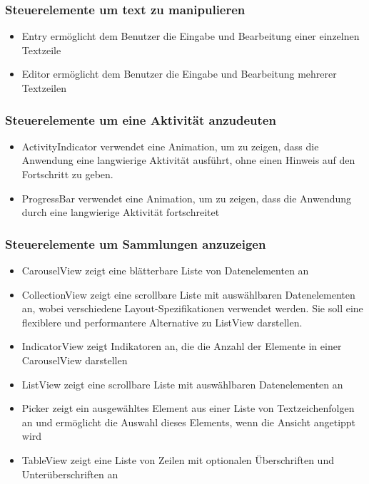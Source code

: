 \subsubsection{Steuerelemente um text zu manipulieren}

\begin{itemize}
\setlength\itemsep{-0.6em}
 \item Entry ermöglicht dem Benutzer die Eingabe und Bearbeitung einer einzelnen Textzeile
 \item Editor ermöglicht dem Benutzer die Eingabe und Bearbeitung mehrerer Textzeilen
\end{itemize}
\subsubsection{Steuerelemente um eine Aktivität anzudeuten}


\begin{itemize}
\setlength\itemsep{-0.6em}
 \item ActivityIndicator verwendet eine Animation, um zu zeigen, dass die Anwendung eine langwierige Aktivität ausführt, ohne einen Hinweis auf den Fortschritt zu geben. 
 \item ProgressBar verwendet eine Animation, um zu zeigen, dass die Anwendung durch eine langwierige Aktivität fortschreitet
\end{itemize}

\subsubsection{Steuerelemente um Sammlungen anzuzeigen}
\begin{itemize}
\setlength\itemsep{-0.6em}
 \item CarouselView zeigt eine blätterbare Liste von Datenelementen an
 \item CollectionView zeigt eine scrollbare Liste mit auswählbaren Datenelementen an, wobei verschiedene Layout-Spezifikationen verwendet werden. Sie soll eine flexiblere und performantere Alternative zu ListView darstellen. 
  \item IndicatorView zeigt Indikatoren an, die die Anzahl der Elemente in einer CarouselView darstellen
 \item ListView zeigt eine scrollbare Liste mit auswählbaren Datenelementen an
 \item Picker zeigt ein ausgewähltes Element aus einer Liste von Textzeichenfolgen an und ermöglicht die Auswahl dieses Elements, wenn die Ansicht angetippt wird
 \item TableView zeigt eine Liste von Zeilen mit optionalen Überschriften und Unterüberschriften an
\end{itemize}

